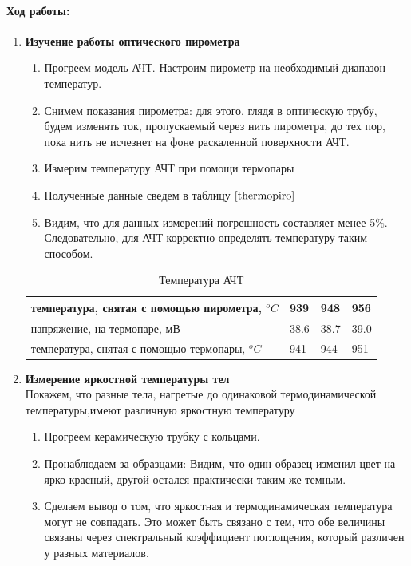 \documentclass[a4paper,12pt]{article}
\begin{document}
\paragraph{Ход работы:}
\begin{enumerate}
\itemsep0em
\item \textbf{Изучение работы оптического пирометра}
\begin{enumerate}
\itemsep0em
\item Прогреем модель АЧТ. Настроим пирометр на необходимый диапазон температур.
\item Снимем показания пирометра: для этого, глядя в оптическую трубу, будем изменять ток, пропускаемый через нить пирометра, до тех пор, пока нить не исчезнет на фоне раскаленной поверхности АЧТ.
\item Измерим температуру АЧТ при помощи термопары
\item Полученные данные сведем в таблицу $\ref{thermopiro}$
\item Видим, что для данных измерений погрешность составляет менее 5$\%$. Следовательно, для АЧТ корректно определять температуру таким способом.
\end{enumerate}
\begin{table}[h!]
\centering
\begin{tabular}{|l|l|l|l|}
\hline
температура, снятая с помощью пирометра, $^oC$ & 939  & 948  & 956  \\ \hline
напряжение, на термопаре, мВ                   & 38.6 & 38.7 & 39.0 \\ \hline
температура, снятая с помощью термопары, $^oC$ & 941  & 944  & 951  \\ \hline
\end{tabular}
\caption{Температура АЧТ}
\label{thermopiro}
\end{table}
\item \textbf{Измерение яркостной температуры тел}\\
Покажем, что разные тела, нагретые до одинаковой термодинамической температуры,имеют различную яркостную температуру
\begin{enumerate}
\item Прогреем керамическую трубку с кольцами.
\item Пронаблюдаем за образцами: Видим, что один образец изменил цвет на ярко-красный, другой остался практически таким же темным.
\item Сделаем вывод о том, что яркостная и термодинамическая температура могут не совпадать. Это может быть связано с тем, что обе величины связаны через спектральный коэффициент поглощения, который различен у разных материалов.

\end{enumerate}
\end{enumerate}
\end{document}
